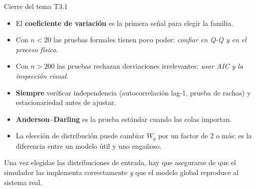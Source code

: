\documentclass[aspectratio=1610, 10pt]{beamer}
\begin{document}
\begin{frame}{Cierre del tema T3.1}
  \begin{itemize}\itemsep3pt
    \item El \textbf{coeficiente de variación} es la primera señal para elegir la familia.
    \item Con $n<20$ las pruebas formales tienen poco poder: \emph{confiar en Q-Q y
      en el proceso físico}.
    \item Con $n>200$ las pruebas rechazan desviaciones irrelevantes: \emph{usar AIC y
      la inspección visual}.
    \item \textbf{Siempre} verificar independencia (autocorrelación lag-1, prueba de rachas)
      y estacionariedad antes de ajustar.
    \item \textbf{Anderson--Darling} es la prueba estándar cuando las colas importan.
    \item La elección de distribución puede cambiar $W_q$ por un factor de 2 o más:
      es la diferencia entre un modelo útil y uno engañoso.
  \end{itemize}

  \vspace{6pt}
  \begin{notabox}
    Una vez elegidas las distribuciones de entrada, hay que asegurarse de que el simulador
    las implementa correctamente \emph{y} que el modelo global reproduce al sistema real.
  \end{notabox}
\end{frame}
\end{document}
